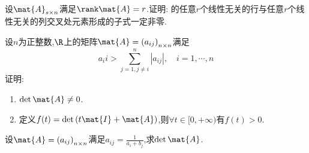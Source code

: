 \documentclass{ctexart}
\begin{document}
\begin{homework}[5(10')]
    设$\mat{A}_{s\times n}$满足$\rank\mat{A}=r$.证明: 的任意$r$个线性无关的行与任意$r$个线性无关的列交叉处元素形成的子式一定非零.
\end{homework}
\begin{homework}[6(10')]
    设$n$为正整数,$\R$上的矩阵$\mat{A}=\left(a_{ij}\right)_{n\times n}$满足
    \[a_ii>\sum_{j=1,j\neq i}^{n}\left|a_{ij}\right|,\quad i=1,\cdots,n\]
    证明:
    \begin{enumerate}
        \item $\det\mat{A}\neq0$.
        \item 定义$f(t)=\det\left(t\mat{I}+\mat{A}\right)$,则$\forall t\in[0,+\infty)$有$f(t)>0$.
    \end{enumerate}
\end{homework}
\begin{homework}[7(10')]
    设$\mat{A}=\left(a_{ij}\right)_{n\times n}$满足$a_{ij}=\frac{1}{a_i+b_j}$,求$\det\mat{A}$.
\end{homework}
\end{document}
